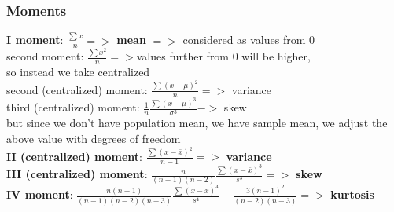 \documentclass{beamer}
\begin{document}
\begin{frame}\frametitle{Moments}
	\textbf{I moment}: $\frac{\sum x}{n} =>$ \textbf{mean} $=>$ considered as values from 0\\
	second moment: $\frac{\sum x^2}{n} => $values further from 0 will be higher, \\so instead we take centralized \\
	second (centralized) moment: $\frac{\sum (x-\mu)^2}{n} =>$ variance\\
	third (centralized) moment: $\frac{1}{n} \frac{\sum (x-\mu)^3}{\sigma ^3} ->$ skew\\
	but since we don't have population mean, we have sample mean, we adjust the above value with degrees of freedom\\
	\textbf{II (centralized) moment}: $\frac{\sum (x-\bar{x})^2}{n-1} =>$ \textbf{variance}\\
	\textbf{III (centralized) moment}: $\frac{n}{(n-1)(n-2)} \frac{\sum (x-\bar{x})^3}{s^3} =>$ \textbf{skew}\\
	\textbf{IV moment}: $\frac{n(n+1)}{(n-1)(n-2)(n-3)} \frac{\sum (x-\bar{x})^4}{s^4}-\frac{3(n-1)^2}{(n-2)(n-3)} =>$ \textbf{kurtosis}\\
	
\end{frame}

\end{document}

